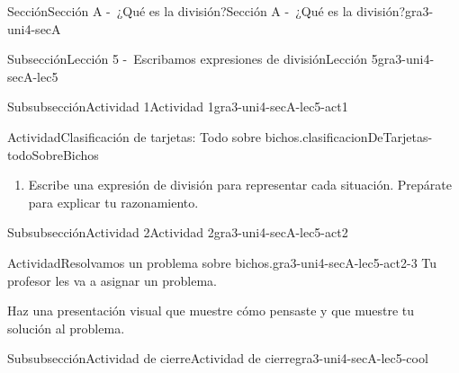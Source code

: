 \documentclass[twoside,14pt,]{extarticle}
\begin{document}
\begin{sectionptx}{Sección}{Sección A -~¿Qué es la división?}{}{Sección A -~¿Qué es la división?}{}{}{gra3-uni4-secA}
\begin{subsectionptx}{Subsección}{Lección 5 -~Escribamos expresiones de división}{}{Lección 5}{}{}{gra3-uni4-secA-lec5}
\begin{subsubsectionptx}{Subsubsección}{Actividad 1}{}{Actividad 1}{}{}{gra3-uni4-secA-lec5-act1}
\begin{activity}{Actividad}{Clasificación de tarjetas: Todo sobre bichos.}{clasificacionDeTarjetas-todoSobreBichos}
\begin{enumerate}
\begin{enumerate}[label=(\Alph*)]
\item{}El grillo topo tiene unas patas especiales para cavar. Diez patas especiales pertenecen a 5 grillos topo. ¿Cuántas patas especiales tiene cada grillo topo?%
\item{}Un escarabajo tiene un par de antenas para detectar el calor, tocar, oler y otras cosas más. Si hay 8 antenas, ¿cuántos escarabajos hay?%
\item{}Catorce antenas pertenecen a un grupo de abejas. Si cada abeja tiene 2 antenas, ¿cuántas abejas hay?%
\item{}Hay 12 alas. Si cada libélula tiene 4 alas, ¿cuántas libélulas hay?%
\item{}Treinta patas pertenecen a 5 hormigas. Si todas las hormigas tienen el mismo número de patas, ¿cuántas patas tiene cada hormiga?%
\item{}En total, hay 50 manchas en 5 mariposas. Si todas las mariposas tienen el mismo número de manchas, ¿cuántas manchas tiene cada mariposa?%
\end{enumerate}
\item{}Escribe una expresión de división para representar cada situación. Prepárate para explicar tu razonamiento.%
\end{enumerate}
\end{activity}%
%
\end{subsubsectionptx}
%
%
\typeout{************************************************}
\typeout{************************************************}
%
\begin{subsubsectionptx}{Subsubsección}{Actividad 2}{}{Actividad 2}{}{}{gra3-uni4-secA-lec5-act2}
\begin{activity}{Actividad}{Resolvamos un problema sobre bichos.}{gra3-uni4-secA-lec5-act2-3}%
Tu profesor les va a asignar un problema.%
\par
Haz una presentación visual que muestre cómo pensaste y que muestre tu solución al problema.%
\end{activity}%
\end{subsubsectionptx}
%
%
\typeout{************************************************}
\typeout{************************************************}
%
\begin{subsubsectionptx}{Subsubsección}{Actividad de cierre}{}{Actividad de cierre}{}{}{gra3-uni4-secA-lec5-cool}

\end{subsubsectionptx}
\end{subsectionptx}
\end{sectionptx}
\end{document}
